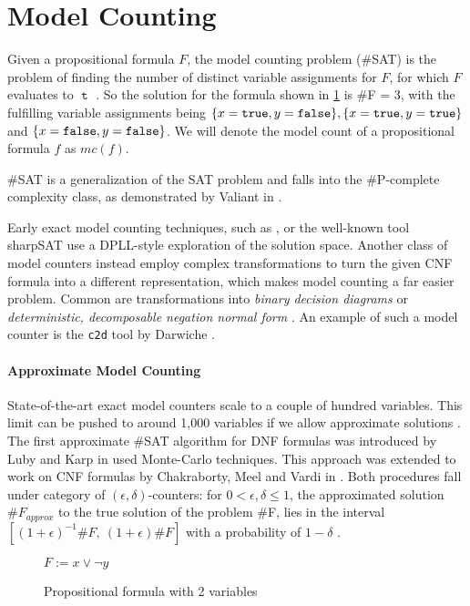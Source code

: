 \section{Model Counting}

Given a propositional formula $F$, the model counting problem (\#SAT) is the problem of finding the number of distinct variable assignments for $F$, for which $F$ evaluates to $\mttt$ \cite{biere09}. So the solution for the formula shown in  \ref{fig:satEx} is \#F = 3, with the fulfilling variable assignments being $\{ x = \mathtt{true}, y = \mathtt{false}\}, \{x = \mathtt{true}, y = \mathtt{true}\}$ and  $\{x = \mathtt{false}, y = \mathtt{false}\}$. We will denote the model count of a propositional formula $f$ as $mc(f)$.

\#SAT is a generalization of the SAT problem and falls into the \#P-complete complexity class, as demonstrated by Valiant in \cite{valiant79}.

Early exact model counting techniques, such as \cite{birnbaum99}, or the well-known tool sharpSAT \cite{thurley06} use a DPLL-style exploration of the solution space. Another class of model counters instead employ complex transformations to turn the given CNF formula into a different representation, which makes model counting a far easier problem. Common are transformations into \emph{binary decision diagrams} \cite{bdd} or \emph{deterministic, decomposable negation normal form} \cite{darwiche01}. An example of such a model counter is the \texttt{c2d} tool by Darwiche \cite{darwiche04}.

\paragraph*{Approximate Model Counting}
State-of-the-art exact model counters scale to a couple of hundred variables.  This limit can be pushed to around 1,000 variables if we allow approximate solutions \cite{biere09}.
The first approximate \#SAT algorithm for DNF formulas was introduced by Luby and Karp in \cite{karp89} used Monte-Carlo techniques. This approach was extended to work on CNF formulas by Chakraborty, Meel and Vardi in \cite{chakraborty13}. Both procedures fall under category of $(\epsilon, \delta)$-counters: for $0 < \epsilon, \delta \leq 1$, the approximated solution $\#F_{approx}$ to the true solution of the problem \#F, lies in the interval $[(1 + \epsilon)^{-1} \#F, \: (1 + \epsilon) \#F]$ with a probability of $1 - \delta$ \cite{karp89,chakraborty13}.

\begin{figure}
    \centering
    $F := x \lor \lnot y$
    \caption{Propositional formula with 2 variables}
    \label{fig:satEx}
\end{figure}


